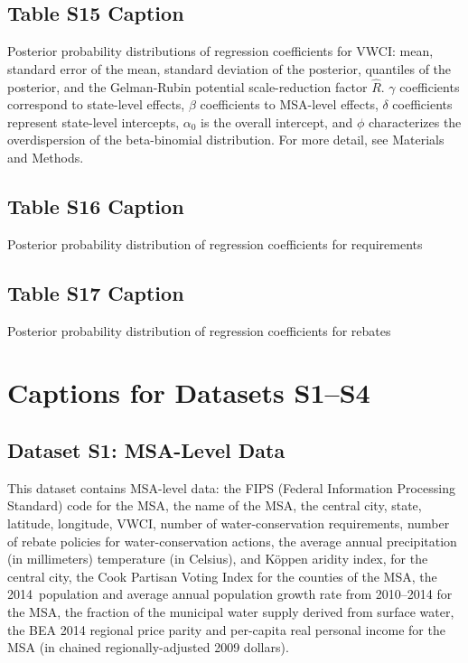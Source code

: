 \documentclass[draft]{agujournal}\usepackage{knitr}
\begin{document}
\subsection*{Table S15 Caption}
\begin{table}[H]
\centering
\caption{Posterior probability distributions of regression coefficients for VWCI: mean, standard error of the mean, standard deviation of the posterior, quantiles of the posterior, and the Gelman-Rubin potential scale-reduction factor $\hat R$. $\gamma$ coefficients correspond to state-level effects, $\beta$ coefficients to MSA-level effects, $\delta$ coefficients represent state-level intercepts, $\alpha_0$ is the overall intercept, and $\phi$ characterizes the overdispersion of the beta-binomial distribution. For more detail, see Materials and Methods.}
\label{tab:vwci_posterior}
\end{table}


\subsection*{Table S16 Caption}
\begin{table}[H]
\centering
\caption{Posterior probability distribution of regression coefficients for requirements}
\label{tab:req_posterior}
\end{table}


\subsection*{Table S17 Caption}
\begin{table}[H]
\centering
\caption{Posterior probability distribution of regression coefficients for rebates}
\label{tab:reb_posterior}
\end{table}



\section*{Captions for Datasets S1--S4}

\subsection*{Dataset S1: MSA-Level Data}

This dataset contains MSA-level data: the FIPS (Federal Information Processing Standard) code for the MSA,
the name of the MSA, the central city, state, latitude, longitude,
VWCI, number of water-conservation requirements, number of rebate policies for water-conservation actions,
the average annual precipitation (in millimeters) temperature (in Celsius), and K\"oppen aridity index, for the central city,
the Cook Partisan Voting Index for the counties of the MSA,
the 2014~population and average annual population growth rate from 2010--2014 for the MSA,
the fraction of the municipal water supply derived from surface water,
the BEA 2014 regional price parity and per-capita real personal income for the MSA (in chained regionally-adjusted 2009 dollars).
\end{document}
